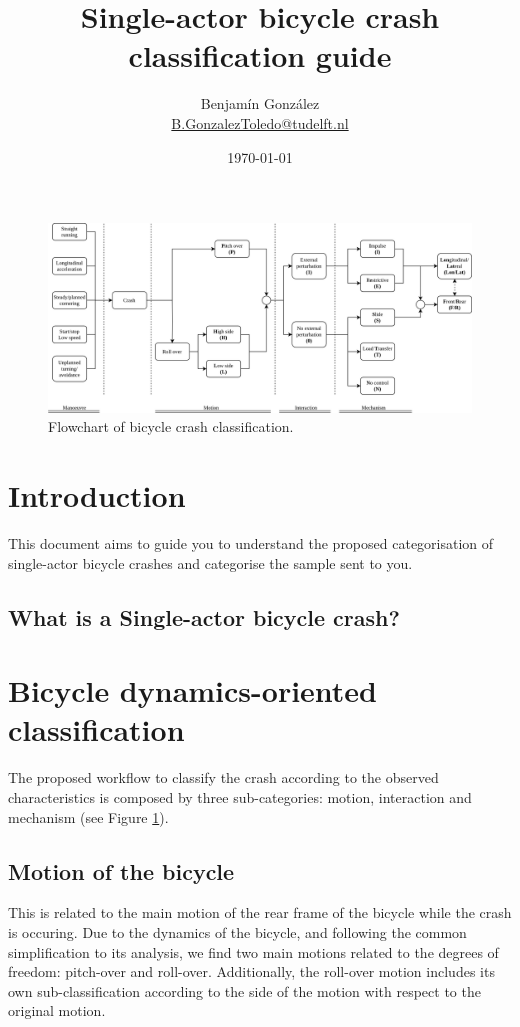 \documentclass{article}
\title{Single-actor bicycle crash classification guide}
\author{
  Benjam\'in Gonz\'alez\\
  \small{\href{mailto:b.gonzaleztoledo@tudelft.nl}{B.GonzalezToledo@tudelft.nl}}
  }
\date{\today}
\begin{document}
\maketitle

\begin{figure}[h]
    \centering
    \includegraphics[width=\linewidth]{class-mindmap.png}
    \caption{Flowchart of bicycle crash classification.}
    \label{fig: flowchart}
\end{figure}

\section{Introduction}

This document aims to guide you to understand the proposed categorisation of single-actor bicycle crashes and categorise the sample sent to you.

\subsection{What is a Single-actor bicycle crash?}

\section{Bicycle dynamics-oriented classification}

The proposed workflow to classify the crash according to the observed characteristics is composed by three sub-categories: motion, interaction and mechanism (see Figure \ref{fig: flowchart}).

\subsection{Motion of the bicycle}

This is related to the main motion of the rear frame of the bicycle while the crash is occuring.
%
Due to the dynamics of the bicycle, and following the common simplification to its analysis, we find two main motions related to the degrees of freedom: pitch-over and roll-over.
%
Additionally, the roll-over motion includes its own sub-classification according to the side of the motion with respect to the original motion.
\end{document}
